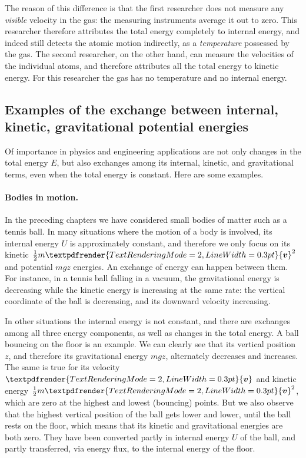 \documentclass[a4paper,12pt,%
onecolumn,oneside,%
british%
]{memoir}
\renewcommand*{\bm}[1]{\textpdfrender{TextRenderingMode=2,LineWidth=0.3pt}{\boldsymbol{#1}}}
\renewcommand*{\|}[1][]{\nonscript\:#1\vert\nonscript\:\mathopen{}}
\newcommand*{\yv}{\bm{v}}
\newcommand*{\yM}{m}%
\newcommand*{\yE}{E}
\newcommand*{\yU}{U}
\begin{document}
The reason of this difference is that the first researcher does not measure any \emph{visible} velocity in the gas: the measuring instruments average it out to zero. This researcher therefore attributes the total energy completely to internal energy, and indeed still detects the atomic motion indirectly, as a \emph{temperature} possessed by the gas. The second researcher, on the other hand, can measure the velocities of the individual atoms, and therefore attributes all the total energy to kinetic energy. For this researcher the gas has no temperature and no internal energy.


\subsection{Examples of the exchange between internal, kinetic, gravitational potential energies}
\label{sec:energy_constitutive_content}

Of importance in physics and engineering applications are not only changes in the total energy $\yE$, but also exchanges among its internal, kinetic, and gravitational terms, even when the total energy is constant. Here are some examples.

\paragraph{Bodies in motion.}

In the preceding chapters we have considered small bodies of matter such as a tennis ball. In many situations where the motion of a body is involved, its internal energy $\yU$ is approximately constant, and therefore we only focus on its kinetic $\tfrac{1}{2}\yM \yv^{2}$ and potential $\yM g z$ energies. An exchange of energy can happen between them. For instance, in a tennis ball falling in a vacuum, the gravitational energy is decreasing while the kinetic energy is increasing at the same rate: the vertical coordinate of the ball is decreasing, and its downward velocity increasing.

In other situations the internal energy is not constant, and there are exchanges among all three energy components, as well as changes in the total energy. A ball bouncing on the floor is an example. We can clearly see that its vertical position $z$, and therefore its gravitational energy $\yM g z$, alternately decreases and increases. The same is true for its velocity $\yv$ and kinetic energy $\tfrac{1}{2}\yM \yv^{2}$, which are zero at the highest and lowest (bouncing) points. But we also observe that the highest vertical position of the ball gets lower and lower, until the ball rests on the floor, which means that its kinetic and gravitational energies are both zero. They have been converted partly in internal energy $\yU$ of the ball, and partly transferred, via energy flux, to the internal energy of the floor.
\end{document}
